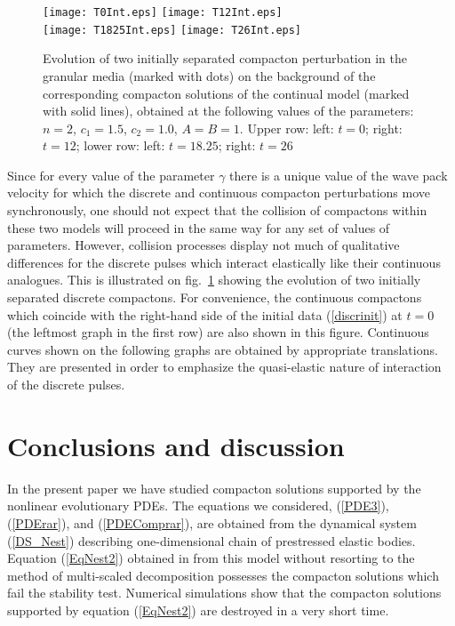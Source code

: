 \documentclass[12pt]{article}
\begin{document}
\begin{figure}
\begin{center}
\texttt{[image: T0Int.eps]}
\texttt{[image: T12Int.eps]}
\\
\texttt{[image: T1825Int.eps]}
\texttt{[image: T26Int.eps]}
\caption{Evolution of two initially separated compacton perturbation in the granular media (marked with dots) on the background of the corresponding compacton solutions of the continual model   (marked with solid lines), obtained at the following values of the parameters: $n=2$, $c_1=1.5$, $c_2=1.0$, $A=B=1.$ Upper row: left: $t=0$; right: $t=12$; lower row: left: $t=18.25$; right: $t=26$
}\label{Fig:collisions} \end{center}
\end{figure}

Since for every value of the parameter $\gamma$ there is a unique value of the wave pack velocity for
which the discrete and continuous compacton perturbations move synchronously, one should not expect
that the collision of compactons within these two models will proceed in the same way for any
set of values of parameters. However, collision processes display not much of qualitative differences for the  discrete
pulses which interact elastically like their continuous analogues. This is illustrated on
fig.~\ref{Fig:collisions} showing the evolution of two initially separated discrete compactons. For
convenience,  the continuous compactons which coincide with the right-hand side of the initial data (\ref{discrinit}) at $t=0$ (the leftmost graph in the first row) are also shown in this figure. Continuous curves shown on the following graphs are obtained by appropriate translations.  They are presented in order to emphasize the quasi-elastic nature of interaction of the discrete pulses.



\section{Conclusions and discussion}  \label{vs:sec5}




In the present paper we have studied compacton solutions supported by the nonlinear evolutionary PDEs. The equations we considered, (\ref{PDE3}), (\ref{PDErar}), and (\ref{PDEComprar}), are obtained from the  dynamical system (\ref{DS_Nest}) describing one-dimensional chain of prestressed elastic bodies. Equation (\ref{EqNest2}) obtained in \cite{Nester_02} from this model without resorting to the method of multi-scaled decomposition possesses the compacton solutions which fail the stability test. Numerical simulations show that the compacton solutions supported by equation (\ref{EqNest2}) are destroyed in a very short time.
\end{document}
